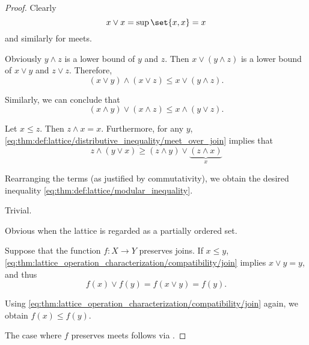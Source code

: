 \begin{proof}
   Clearly
  \begin{equation*}
    x \vee x = \sup\set{ x, x } = x
  \end{equation*}
  and similarly for meets.

   Obviously \( y \wedge z \) is a lower bound of \( y \) and \( z \). Then \( x \vee (y \wedge z) \) is a lower bound of \( x \vee y \) and \( z \vee z \). Therefore,
  \begin{equation*}
    (x \vee y) \wedge (x \vee z) \leq x \vee (y \wedge z).
  \end{equation*}

  Similarly, we can conclude that
  \begin{equation*}
    (x \wedge y) \vee (x \wedge z) \leq x \wedge (y \vee z).
  \end{equation*}

   Let \( x \leq z \). Then \( z \wedge x = x \). Furthermore, for any \( y \), \eqref{eq:thm:def:lattice/distributive_inequality/meet_over_join} implies that
  \begin{equation*}
    z \wedge (y \vee x) \geq (z \wedge y) \vee \underbrace{(z \wedge x)}_{x}
  \end{equation*}

  Rearranging the terms (as justified by commutativity), we obtain the desired inequality \eqref{eq:thm:def:lattice/modular_inequality}.

   Trivial.

   Obvious when the lattice is regarded as a partially ordered set.

   Suppose that the function \( f: X \to Y \) preserves joins. If \( x \leq y \), \eqref{eq:thm:lattice_operation_characterization/compatibility/join} implies \( x \vee y = y \), and thus
  \begin{equation*}
    f(x) \vee f(y) = f(x \vee y) = f(y).
  \end{equation*}

  Using \eqref{eq:thm:lattice_operation_characterization/compatibility/join} again, we obtain \( f(x) \leq f(y) \).

  The case where \( f \) preserves meets follows via .


\end{proof}
